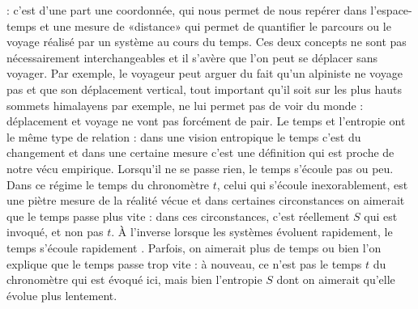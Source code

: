 : c'est d'une part une coordonnée, qui nous permet de nous repérer dans l'espace-temps et une mesure de «distance» qui permet de quantifier le parcours ou le voyage réalisé par un système au cours du temps. Ces deux concepts ne sont pas nécessairement interchangeables et il s'avère que l'on peut se déplacer sans voyager. Par exemple, le voyageur peut arguer du fait qu'un alpiniste ne voyage pas et que son déplacement vertical, tout important qu'il soit sur les plus hauts sommets himalayens par exemple, ne lui permet pas de voir du monde : déplacement et voyage ne vont pas forcément de pair. Le temps et l'entropie ont le même type de relation : dans une vision entropique le temps c'est du changement et dans une certaine mesure c'est une définition qui est proche de notre vécu empirique. Lorsqu'il ne se passe rien, le temps s'écoule pas ou peu. Dans ce régime le temps du chronomètre $t$, celui qui s'écoule inexorablement, est une piètre mesure de la réalité vécue et dans certaines circonstances on aimerait que le temps passe plus vite : dans ces circonstances, c'est réellement $S$ qui est invoqué, et non pas $t$. À l'inverse lorsque les systèmes évoluent rapidement, le temps s'écoule rapidement . Parfois, on aimerait plus de temps ou bien l'on explique que le temps passe trop vite : à nouveau, ce n'est pas le temps $t$ du chronomètre qui est évoqué ici, mais bien l'entropie $S$ dont on  aimerait qu'elle évolue plus lentement.

